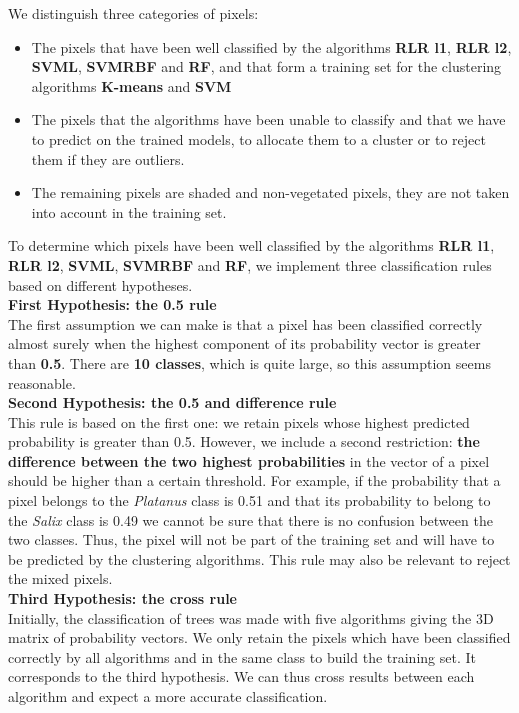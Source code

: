 \documentclass{siamart171218}
\begin{document}
We distinguish three categories of pixels: 
\begin{itemize}
\item{The pixels that have been well classified by the algorithms \textbf{RLR l1}, \textbf{RLR l2}, \textbf{SVML}, \textbf{SVMRBF} and \textbf{RF}, and that form a training set for the clustering algorithms \textbf{K-means} and \textbf{SVM}}
\item{The pixels that the algorithms have been unable to classify and that we have to predict on the trained models, to allocate them to a cluster or to reject them if they are outliers}. 
\item{The remaining pixels are shaded and non-vegetated pixels, they are not taken into account in the training set.}
\end{itemize} 

To determine which pixels have been well classified by the algorithms \textbf{RLR l1}, \textbf{RLR l2}, \textbf{SVML}, \textbf{SVMRBF} and \textbf{RF}, we implement three classification rules based on different hypotheses. \\

\textbf{First Hypothesis: the 0.5 rule}\\
The first assumption we can make is that a pixel has been classified correctly almost surely when the highest component of its probability vector is greater than \textbf{0.5}. There are \textbf{10 classes}, which is quite large, so this assumption seems reasonable. \\

\textbf{Second Hypothesis: the 0.5 and difference rule}\\
This rule is based on the first one: we retain pixels whose highest predicted probability is greater than 0.5. However, we include a second restriction: \textbf{the difference between the two highest probabilities} in the vector of a pixel should be higher than a certain threshold. For example, if the probability that a pixel belongs to the \textit{Platanus} class is 0.51 and that its probability to belong to the \textit{Salix} class is 0.49 we cannot be sure that there is no confusion between the two classes. Thus, the pixel will not be part of the training set and will have to be predicted by the clustering algorithms. This rule may also be relevant to reject the mixed pixels.\\

\textbf{Third Hypothesis: the cross rule}\\
Initially, the classification of trees was made with five algorithms giving the 3D matrix of probability vectors. We only retain the pixels which have been classified correctly by all algorithms and in the same class to build the training set. It corresponds to the third hypothesis. We can thus cross results between each algorithm and expect a more accurate classification.\\
\end{document}
